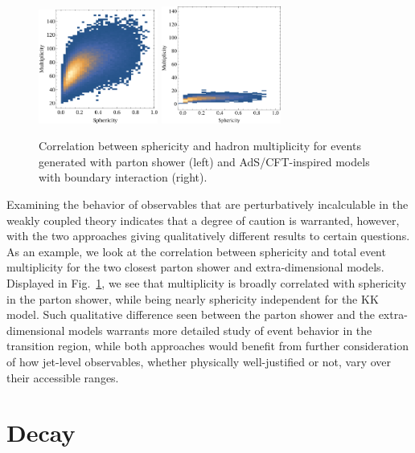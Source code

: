 \begin{figure}[tb!]
	\centering
		\includegraphics[width=0.35\textwidth]{figures/DS_sphericity_PartonShower.pdf}
	\hspace{5pt}
	\includegraphics[width=0.35\textwidth]{figures/DS_sphericity_KK_bdry.pdf}
	\caption{Correlation between sphericity and hadron multiplicity for events generated with parton shower (left) and AdS/CFT-inspired models with boundary interaction (right).}
	\label{fig:compmult}
\end{figure}

Examining the behavior of observables that are perturbatively incalculable in the weakly coupled theory indicates that a degree of caution is warranted, however, with the two approaches giving qualitatively different results to certain questions. As an example, we look at the correlation between sphericity and total event multiplicity for the two closest parton shower and extra-dimensional models. Displayed in Fig.~\ref{fig:compmult}, we see that multiplicity is broadly correlated with sphericity in the parton shower, while being nearly sphericity independent for the KK model. Such qualitative difference seen between the parton shower and the extra-dimensional models warrants more detailed study of event behavior in the transition region, while both approaches would benefit from further consideration of how jet-level observables, whether physically well-justified or not, vary over their accessible ranges.

\section{Decay}
\label{sec:darkshowerdk}

